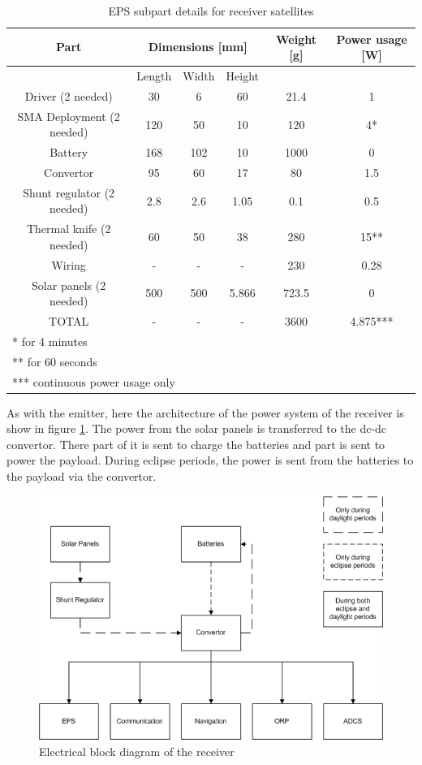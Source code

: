 \begin{table}[H!]
\centering
\begin{tabular}{cccccc}
\toprule
Part & \multicolumn{3}{c}{Dimensions [mm]} & Weight [g] & Power usage [W]\\ 
\midrule
 & Length & Width & Height & & \\ 
 Driver (2 needed) & 30 & 6 & 60 & 21.4 & 1 \\ 
 SMA Deployment (2 needed) & 120 & 50 & 10 & 120 & 4* \\ 
 Battery & 168 & 102 & 10 & 1000 & 0 \\ 
 Convertor & 95 & 60 & 17 & 80 & 1.5 \\ 
 Shunt regulator  (2 needed) & 2.8 & 2.6 & 1.05 & 0.1 & 0.5 \\ 
 Thermal knife (2 needed) & 60 & 50 & 38 & 280 & 15**  \\
 Wiring & - & - & - & 230 & 0.28 \\ 
 Solar panels (2 needed) & 500 & 500 & 5.866 & 723.5 & 0 \\
 \midrule
 TOTAL & - & - & - & 3600 & 4.875***  \\ 
\bottomrule
 \multicolumn{6}{l}{* for 4 minutes} \\
 \multicolumn{6}{l}{** for 60 seconds} \\
 \multicolumn{6}{l}{*** continuous power usage only} \\
\end{tabular}
\caption{EPS subpart details for receiver satellites}
\label{tab:EPS_detailsRec}
\end{table}


As with the emitter, here the architecture of the power system of the receiver is show in figure \ref{fig:receiver_block}. The power from the solar panels is transferred to the dc-dc convertor. There part of it is sent to charge the batteries and part is sent to power the payload. During eclipse periods, the power is sent from the batteries to the payload via the convertor.

\begin{figure}[H!]
\centering
\includegraphics{chapters/img/EPS receiver block diagram.png}
\caption{Electrical block diagram of the receiver}
\label{fig:receiver_block}
\end{figure}